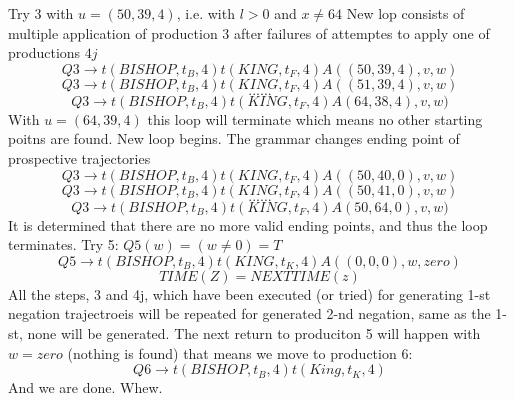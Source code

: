 \documentclass[11pt]{article}
\begin{document}
Try 3 with $u = (50, 39, 4)$, i.e. with $l > 0$ and $x \not = 64$
New lop consists of multiple application of production 3 after failures of attemptes to apply one of productions $4j$
$$Q3 \rightarrow t(BISHOP, t_B, 4)t(KING, t_F, 4) A((50, 39, 4), v, w)$$
$$Q3 \rightarrow t(BISHOP, t_B, 4)t(KING, t_F, 4) A((51, 39, 4), v, w)$$
$$......$$
$$Q3 \rightarrow t(BISHOP, t_B, 4)t(KING, t_F, 4) A(64, 38, 4), v, w)$$
With $u = (64, 39, 4) $ this loop will terminate which means no other starting poitns are found. 
New loop begins. The grammar changes ending point of prospective trajectories 
$$Q3 \rightarrow t(BISHOP, t_B, 4)t(KING, t_F, 4) A((50, 40, 0), v, w)$$
$$Q3 \rightarrow t(BISHOP, t_B, 4)t(KING, t_F, 4) A((50, 41, 0), v, w)$$
$$......$$
$$Q3 \rightarrow t(BISHOP, t_B, 4)t(KING, t_F, 4) A(50, 64, 0), v, w)$$
It is determined that there are no more valid ending points, and thus the loop terminates. 
Try 5: $Q5(w) = (w \not = 0 ) = T$
$$Q5 \rightarrow t(BISHOP, t_B, 4) t(KING, t_K, 4)A((0, 0, 0), w, zero)$$
$$TIME(Z) = NEXTTIME(z)$$
All the steps, 3 and 4j, which have been executed (or tried) for generating 1-st negation trajectroeis will be repeated for generated 2-nd negation, same as the 1-st, none will be generated. The next return to produciton 5 will happen with $w = zero$ (nothing is found) that means we move to production 6: 
$$Q6 \rightarrow t(BISHOP, t_B, 4)t(King, t_K, 4)$$
 And we are done. Whew. 
\end{document}
